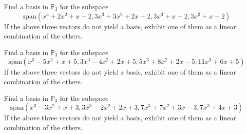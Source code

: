 \documentclass{ximera}
\begin{document}
\begin{problem}\label{prb:10.33} Find a basis in $\mathbb{P}_{3}$ for the subspace
\begin{equation*}
\mbox{span}\left(
x^{3}+2x^{2}+x-2,3x^{3}+3x^{2}+2x-2,3x^{3}+x+2,3x^{3}+x+2\right)
\end{equation*}
If the above three vectors do not yield a basis, exhibit one of them as a
linear combination of the others.
\end{problem}


\begin{problem}\label{prb:10.34} Find a basis in $\mathbb{P}_{3}$ for the subspace
\begin{equation*}
\mbox{span}\left(
x^{3}-5x^{2}+x+5,3x^{3}-4x^{2}+2x+5,5x^{3}+8x^{2}+2x-5,11x^{3}+6x+5\right)
\end{equation*}
If the above three vectors do not yield a basis, exhibit one of them as a
linear combination of the others.
\end{problem}


\begin{problem}\label{prb:10.35} Find a basis in $\mathbb{P}_{3}$ for the subspace
\begin{equation*}
\mbox{span}\left(
x^{3}-3x^{2}+x+3,3x^{3}-2x^{2}+2x+3,7x^{3}+7x^{2}+3x-3,7x^{3}+4x+3\right)
\end{equation*}
If the above three vectors do not yield a basis, exhibit one
of them as a linear combination of the others.
\end{problem}




\end{document}
